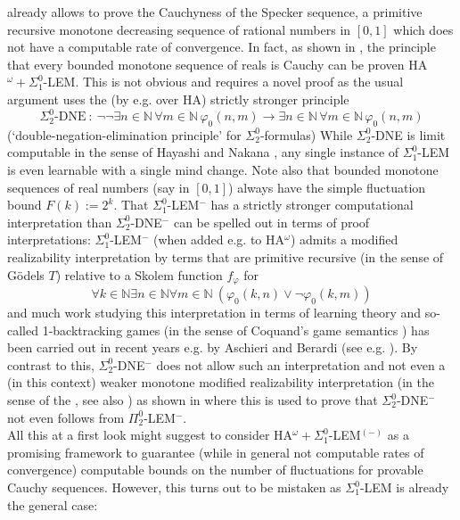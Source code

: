 \documentclass[1p]{elsarticle}
\newcommand{\NN}{\ensuremath{\mathbb{N}}}
\theoremstyle{plain}
\theoremstyle{definition}
\theoremstyle{remark}
\theoremstyle{definition}
\begin{document}
already allows 
to prove the Cauchyness of the Specker sequence, a primitive recursive 
monotone decreasing sequence of rational numbers in $[0,1]$ which does not 
have a computable rate of convergence. In fact, as shown in \cite{Toftdal}, 
the principle that every bounded monotone sequence of reals is Cauchy can be 
proven HA$^{\omega}+\Sigma^0_1$-LEM. This is not obvious and requires a novel 
proof as the usual argument uses the (by \cite{Akama} e.g. over HA) 
strictly stronger principle 
\[ \Sigma^0_2\mbox{-DNE}\ :\ \neg\neg\exists n\in\NN\,\forall m\in\NN\,
\varphi_0(n,m)\to\exists n\in\NN\,\forall m\in\NN\,\varphi_0(n,m) \]
(`double-negation-elimination principle' for 
$\Sigma^0_2$-formulas) While $\Sigma^0_2$-DNE is limit computable in the 
sense of Hayashi and 
Nakana \cite{Hayashi/Nakata}, 
any single instance of $\Sigma^0_1$-LEM is even learnable 
with a single mind change. Note also that bounded monotone sequences of 
real numbers (say in $[0,1]$) always have the simple fluctuation bound 
$F(k):=2^k.$ That $\Sigma^0_1$-LEM$^-$ has a strictly stronger 
computational interpretation than $\Sigma^0_2$-DNE$^-$ can be spelled 
out in terms of proof interpretations:  $\Sigma^0_1$-LEM$^-$ (when added 
e.g. to HA$^{\omega}$) admits  
a modified realizability interpretation 
by terms that are primitive recursive (in the 
sense of G\"odels $T$) relative to a Skolem function $f_{\varphi}$ for 
\[ \forall k\in\NN\exists n \in\NN\forall m\in\NN 
\ (\varphi_0(k,n)\vee\neg\varphi_0(k,m)) 
\]  
and much work studying this interpretation in terms of learning 
theory and so-called 1-backtracking games (in the sense of 
Coquand's game semantics \cite{Coquand,Berardi/Coquand/Hayashi}) 
has been carried out in recent years e.g. by 
Aschieri and Berardi (see e.g. 
\cite{Aschieri/Berardi,Aschieri1,Aschieri2}). By contrast to this, 
$\Sigma^0_2$-DNE$^-$ does not allow such an interpretation and not 
even a (in this context) weaker monotone modified realizability 
interpretation (in the sense of the \cite{Kohlenbach(relative)}, 
see also \cite{Kohlenbach(book)}) as shown in \cite{Akama} where this 
is used to prove that $\Sigma^0_2$-DNE$^-$ not even follows from 
$\Pi^0_2$-LEM$^-$. \\[2mm]
All this at a first look might suggest to consider 
HA$^{\omega}+\Sigma^0_1$-LEM$^{(-)}$ as a promising framework to 
guarantee (while in general not computable rates of convergence) 
computable bounds on the number of fluctuations for provable Cauchy 
sequences. However, this 
turns out to be mistaken as $\Sigma^0_1$-LEM is already the general case: 
\end{document}
